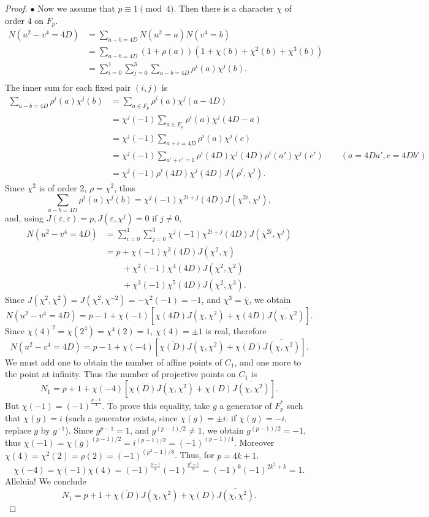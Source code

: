 \documentclass[11pt,a4paper]{article}
\begin{document}
\begin{proof}
$\bullet$ Now we assume that $p\equiv 1 \pmod 4$. Then there is a character $\chi$ of order $4$ on $F_p$.
\begin{align*}
N(u^2 - v^4 = 4D) &= \sum_{a-b = 4D} N(u^2=a)N(v^4=b)\\
&=\sum_{a-b = 4D} (1+\rho(a))(1+\chi(b) + \chi^2(b) + \chi^3(b))\\
&=\sum_{i=0}^1 \sum_{j=0}^3 \sum_{a-b = 4D} \rho^i(a) \chi^j(b).\\
\end{align*}
The inner sum for each fixed pair $(i,j)$ is
\begin{align*}
\sum_{a-b = 4D} \rho^i(a) \chi^j(b) &= \sum_{a \in F_p} \rho^i(a) \chi^j(a - 4D)\\
&=\chi^j(-1)\sum_{a \in F_p} \rho^i(a) \chi^j(4D-a)\\
&= \chi^j(-1)\sum_{a + c = 4D}\rho^i(a) \chi^j(c)\\
&= \chi^j(-1)\sum_{a' + c' = 1} \rho^i(4D) \chi^j(4D) \rho^i(a') \chi^j(c') \qquad (a = 4Da', c = 4Db')\\
&=\chi^j(-1) \rho^i(4D) \chi^j(4D) J(\rho^i, \chi^j).
\end{align*}
Since $\chi^2$ is of order 2, $\rho = \chi^2$, thus
$$\sum_{a-b = 4D} \rho^i(a) \chi^j(b)  = \chi^j(-1)  \chi^{2i+j}(4D) J(\chi^{2i},\chi^j),$$
and, using $J(\varepsilon,\varepsilon) = p , J(\varepsilon,\chi^j) =0$ if $j\ne 0$,
\begin{align*}
N(u^2 - v^4 = 4D)  &= \sum_{i=0}^1 \sum_{j=0}^3 \chi^j(-1)  \chi^{2i+j}(4D) J(\chi^{2i},\chi^j)\\
&=p + \chi(-1) \chi^3(4D) J(\chi^2,\chi) \\
&\phantom{=p\, } + \chi^2(-1) \chi^4(4D) J(\chi^2,\chi^2) \\
&\phantom{=p\, }+ \chi^3(-1) \chi^5(4D) J(\chi^2,\chi^3).
\end{align*}
Since $J(\chi^2,\chi^2) = J(\chi^2,\chi^{-2}) = -\chi^2(-1) = -1$, and $\chi^3 = \overline{\chi}$, we obtain
$$N(u^2 - v^4 = 4D) = p-1 + \chi(-1) [\overline{\chi(4D)} J(\chi,\chi^2) +\chi(4D) \overline{J(\chi,\chi^2)}].$$
Since $\chi(4)^2 = \chi(2^4) = \chi^4(2) = 1$,  $\chi(4) = \pm 1$ is real, therefore
$$N(u^2 - v^4 = 4D) = p-1 + \chi(-4) \left [\overline{\chi(D)} J(\chi,\chi^2) +\chi(D) \overline{J(\chi,\chi^2)}\right].$$
We must add one to obtain the number of affine points of $C_1$, and one more to the point at infinity. Thus the number of projective points on $C_1$ is
$$N_1 = p+1 + \chi(-4)[\overline{\chi(D)} J(\chi,\chi^2) +\chi(D) \overline{J(\chi,\chi^2)}].$$
But $\chi(-1) = (-1)^{\frac{p-1}{4}}$. To prove this equality, take $g$ a generator of $F_p^*$ such that $\chi(g) = i$ (such a generator exists, since $\chi(g) = \pm i$: if $\chi(g) = -i$, replace $g$ by $g^{-1}$). Since $g^{p-1} = 1$, and $g^{(p-1)/2} \ne 1$, we obtain $g^{(p-1)/2} = -1$, thus $\chi(-1) = \chi(g)^{(p-1)/2} = i ^{(p-1)/2} = (-1)^{(p-1)/4}$.
Moreover $\chi(4) = \chi^2(2) = \rho(2) = (-1)^{(p^2-1)/8}$. Thus, for $p = 4k +1$,
$$\chi(-4) = \chi(-1) \chi(4) = (-1)^\frac{p-1}{4} (-1)^\frac{p^2 - 1}{8} = (-1)^k (-1)^{2k^2 + k} = 1.$$
Alleluia! We conclude
$$N_1 = p+1 + \overline{\chi(D)} J(\chi,\chi^2) +\chi(D) \overline{J(\chi,\chi^2)}.$$
\end{proof}
\end{document}
